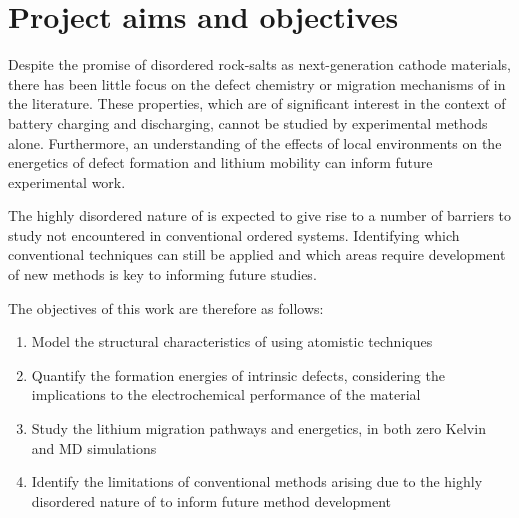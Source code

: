 \section{Project aims and objectives}
Despite the promise of disordered rock-salts as next-generation cathode materials, there has been little focus on the defect chemistry or migration mechanisms of  in the literature.
These properties, which are of significant interest in the context of battery charging and discharging, cannot be studied by experimental methods alone.
Furthermore, an understanding of the effects of local environments on the energetics of defect formation and lithium mobility can inform future experimental work.

The highly disordered nature of  is expected to give rise to a number of barriers to study not encountered in conventional ordered systems.
Identifying which conventional techniques can still be applied and which areas require development of new methods is key to informing future studies.

\noindent
The objectives of this work are therefore as follows:
\begin{enumerate}
	\item Model the structural characteristics of  using atomistic techniques
	\item Quantify the formation energies of intrinsic defects, considering the implications to the electrochemical performance of the material
	\item Study the lithium migration pathways and energetics, in both zero Kelvin and MD simulations
	\item Identify the limitations of conventional methods arising due to the highly disordered nature of  to inform future method development
\end{enumerate}